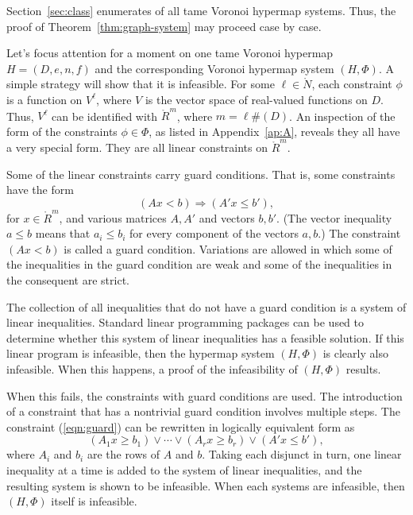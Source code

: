 Section~\ref{sec:class} enumerates of all tame Voronoi
hypermap systems.  Thus, the proof of
Theorem~\ref{thm:graph-system} may proceed case by case.


Let's focus attention for a moment on one tame Voronoi hypermap $H=(D,e,n,f)$ and the corresponding Voronoi hypermap system $(H,\Phi)$.
A simple strategy will show that it is infeasible.
For some $\ell\in\ring{N}$,
each constraint $\phi$ is a function on $V^\ell$, where $V$ is
the vector space of real-valued functions on $D$.  Thus,
$V^\ell$ can be identified with $\ring{R}^m$, where $m= \ell \#(D)$.
An inspection of the form of the constraints $\phi\in \Phi$, as listed
in Appendix~\ref{ap:A}, reveals they all have a 
very special form.  They are all linear constraints
on $\ring{R}^m$.  

Some of the linear constraints
carry guard conditions.  That is, some constraints have the form
  \begin{equation}\label{eqn:guard}
  (A x < b)  \Rightarrow (A' x \le b'),
  \end{equation}
for $x\in\ring{R}^m$, and various matrices $A,A'$ and vectors
$b,b'$.  (The vector inequality $a \le b$ means
that $a_i\le b_i$ for every component of the vectors $a,b$.)
The constraint $(A x < b)$ is called a guard condition.
Variations are allowed in which some of the inequalities in the
guard condition are weak and some of the inequalities in the
consequent are strict.

The collection of all inequalities that do not have a guard 
condition is a system of linear inequalities.  Standard linear
programming packages can be used to determine whether this
system of linear inequalities has a feasible solution.  If this
linear program is infeasible, then the hypermap system $(H,\Phi)$
is clearly also infeasible.  When this happens, a
proof of the infeasibility of $(H,\Phi)$ results.

When this fails, the constraints with guard conditions are
used.
The introduction of a constraint that has a nontrivial guard condition
involves multiple steps.  
The constraint (\ref{eqn:guard}) can be rewritten in logically
equivalent form as
  $$
   (A_{1} x \ge b_{1}) \lor \cdots \lor
   (A_{r} x \ge b_{r}) \lor (A' x \le b'),
  $$
where $A_{i}$ and $b_{i}$ are the rows of $A$ and $b$.
Taking each disjunct in turn, one linear inequality at a time
is added to the system
of linear inequalities, and the resulting system is shown to be
infeasible.  When each
systems are infeasible, then $(H,\Phi)$ itself is infeasible.


